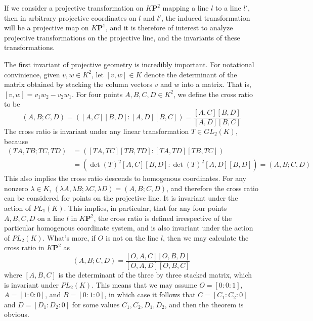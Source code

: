 If we consider a projective transformation on $K\mathbf{P}^2$ mapping a line $l$ to a line $l'$, then in arbitrary projective coordinates on $l$ and $l'$, the induced transformation will be a projective map on $K\mathbf{P}^1$, and it is therefore of interest to analyze projective transformations on the projective line, and the invariants of these transformations.

The first invariant of projective geometry is incredibly important. For notational convinience, given $v,w \in K^2$, let $[v,w] \in K$ denote the determinant of the matrix obtained by stacking the column vectors $v$ and $w$ into a matrix. That is, $[v,w] = v_1w_2 - v_2w_1$. For four points $A,B,C,D \in K^2$, we define the cross ratio to be
%
\[ (A,B;C,D) = \left( [A,C][B,D] : [A,D][B,C] \right) = \frac{[A,C][B,D]}{[A,D][B,C]} \]
%
The cross ratio is invariant under any linear transformation $T \in GL_2(K)$, because
%
\begin{align*}
    (TA,TB;TC,TD) &= \left( [TA,TC][TB,TD] : [TA,TD][TB,TC] \right)\\
    &= (\det(T)^2 [A,C][B,D]: \det(T)^2 [A,D][B,D]) = (A,B;C,D)
\end{align*}
%
This also implies the cross ratio descends to homogenous coordinates. For any nonzero $\lambda \in K$, $(\lambda A, \lambda B; \lambda C, \lambda D) = (A,B;C,D)$, and therefore the cross ratio can be considered for points on the projective line. It is invariant under the action of $PL_1(K)$. This implies, in particular, that for any four points $A,B,C,D$ on a line $l$ in $K\mathbf{P}^2$, the cross ratio is defined irrespective of the particular homogenous coordinate system, and is also invariant under the action of $PL_2(K)$. What's more, if $O$ is not on the line $l$, then we may calculate the cross ratio in $K\mathbf{P}^2$ as
%
\[ (A,B;C,D) = \frac{[O,A,C][O,B,D]}{[O,A,D][O,B,C]} \]
%
where $[A,B,C]$ is the determinant of the three by three stacked matrix, which is invariant under $PL_2(K)$. This means that we may assume $O = [0:0:1]$, $A = [1:0:0]$, and $B = [0:1:0]$, in which case it follows that $C = [C_1:C_2:0]$ and $D = [D_1:D_2:0]$ for some values $C_1,C_2,D_1,D_2$, and then the theorem is obvious.


